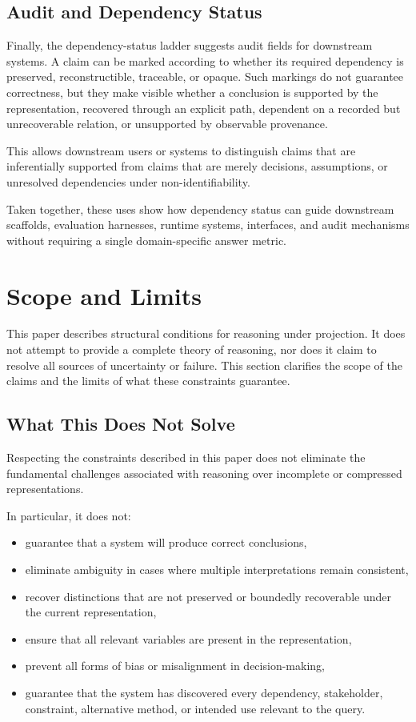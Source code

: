\documentclass[11pt]{article}
\begin{document}
\subsection{Audit and Dependency Status}

Finally, the dependency-status ladder suggests audit fields for downstream systems. A claim can be marked according to whether its required dependency is preserved, reconstructible, traceable, or opaque. Such markings do not guarantee correctness, but they make visible whether a conclusion is supported by the representation, recovered through an explicit path, dependent on a recorded but unrecoverable relation, or unsupported by observable provenance.

This allows downstream users or systems to distinguish claims that are inferentially supported from claims that are merely decisions, assumptions, or unresolved dependencies under non-identifiability.

Taken together, these uses show how dependency status can guide downstream scaffolds, evaluation harnesses, runtime systems, interfaces, and audit mechanisms without requiring a single domain-specific answer metric.

\section{Scope and Limits}

This paper describes structural conditions for reasoning under projection. It does not attempt to provide a complete theory of reasoning, nor does it claim to resolve all sources of uncertainty or failure. This section clarifies the scope of the claims and the limits of what these constraints guarantee.

\subsection{What This Does Not Solve}

Respecting the constraints described in this paper does not eliminate the fundamental challenges associated with reasoning over incomplete or compressed representations.

In particular, it does not:

\begin{itemize}[leftmargin=1.5em]
    \item guarantee that a system will produce correct conclusions,
    \item eliminate ambiguity in cases where multiple interpretations remain consistent,
    \item recover distinctions that are not preserved or boundedly recoverable under the current representation,
    \item ensure that all relevant variables are present in the representation,
    \item prevent all forms of bias or misalignment in decision-making,
    \item guarantee that the system has discovered every dependency, stakeholder, constraint, alternative method, or intended use relevant to the query.
\end{itemize}
\end{document}
